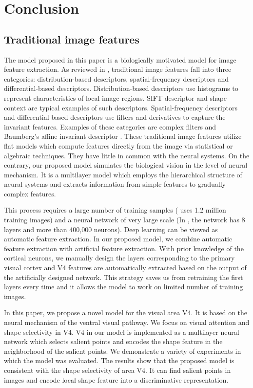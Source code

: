 \documentclass[9pt,twocolumn]{article}
\begin{document}
\section{Conclusion}\label{sec:6}

\subsection{Traditional image features}

The model proposed in this paper is a biologically motivated model for image feature extraction.
As reviewed in \cite{mikolajczyk2005}, traditional image features fall into three categories: 
distribution-based descriptors, spatial-frequency descriptors and differential-based descriptors.
Distribution-based descriptors use histograms to represent characteristics of local image regions.
SIFT descriptor \cite{lowe1999} and shape context \cite{belongie2002} are typical examples of such descriptors.
Spatial-frequency descriptors and differential-based descriptors use filters and derivatives to capture the invariant features. 
Examples of these categories are complex filters \cite{schaffalitzky2002} and Baumberg's affine invariant descriptor \cite{baumberg2000}.
These traditional image features utilize flat models which compute features directly from the image via statistical or algebraic techniques. 
They have little in common with the neural systems.
On the contrary, our proposed model simulates the biological vision in the level of neural mechanism.
It is a multilayer model which employs the hierarchical structure of neural systems and extracts information from simple features to gradually complex features. 

This process requires a large number of training samples (\cite{krizhevsky2012} uses 1.2 million training images)
and a neural network of very large scale (In \cite{krizhevsky2012}, the network has 8 layers and more than 400,000 neurons).
Deep learning can be viewed as automatic feature extraction.
In our proposed model, we combine automatic feature extraction with artificial feature extraction.
With prior knowledge of the cortical neurons, we manually design the layers corresponding to the primary visual cortex
and V4 features are automatically extracted based on the output of the artificially designed network.
This strategy saves us from retraining the first layers every time
and it allows the model to work on limited number of training images.

In this paper, we propose a novel model for the visual area V4.
It is based on the neural mechanism of the ventral visual pathway.
We focus on visual attention and shape selectivity in V4.
V4 in our model is implemented as a multilayer neural network 
which selects salient points and encodes the shape feature in the neighborhood of the salient points.
We demonstrate a variety of experiments in which the model was evaluated.
The results show that the proposed model is consistent with the shape selectivity of area V4.
It can find salient points in images and encode local shape feature into a discriminative representation.
\end{document}
